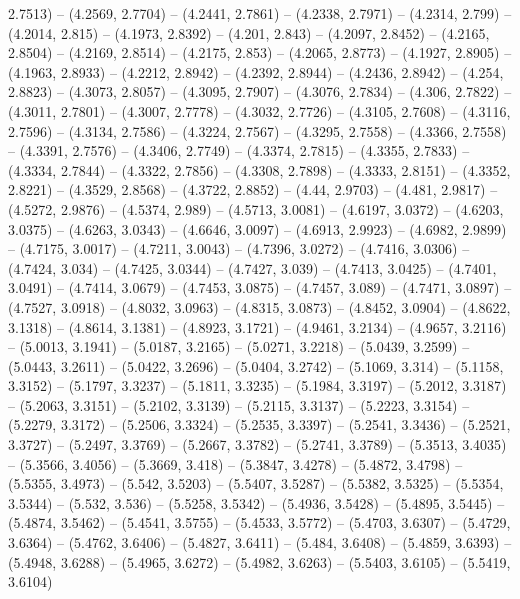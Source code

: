 {  2.7513) -- (4.2569, 2.7704) -- (4.2441, 2.7861) -- (4.2338, 2.7971) -- 
  (4.2314, 2.799) -- (4.2014, 2.815) -- (4.1973, 2.8392) -- (4.201, 2.843) -- 
  (4.2097, 2.8452) -- (4.2165, 2.8504) -- (4.2169, 2.8514) -- (4.2175, 2.853) --
   (4.2065, 2.8773) -- (4.1927, 2.8905) -- (4.1963, 2.8933) -- (4.2212, 2.8942) 
  -- (4.2392, 2.8944) -- (4.2436, 2.8942) -- (4.254, 2.8823) -- (4.3073, 2.8057)
   -- (4.3095, 2.7907) -- (4.3076, 2.7834) -- (4.306, 2.7822) -- (4.3011, 
  2.7801) -- (4.3007, 2.7778) -- (4.3032, 2.7726) -- (4.3105, 2.7608) -- 
  (4.3116, 2.7596) -- (4.3134, 2.7586) -- (4.3224, 2.7567) -- (4.3295, 2.7558) 
  -- (4.3366, 2.7558) -- (4.3391, 2.7576) -- (4.3406, 2.7749) -- (4.3374, 
  2.7815) -- (4.3355, 2.7833) -- (4.3334, 2.7844) -- (4.3322, 2.7856) -- 
  (4.3308, 2.7898) -- (4.3333, 2.8151) -- (4.3352, 2.8221) -- (4.3529, 2.8568) 
  -- (4.3722, 2.8852) -- (4.44, 2.9703) -- (4.481, 2.9817) -- (4.5272, 2.9876) 
  -- (4.5374, 2.989) -- (4.5713, 3.0081) -- (4.6197, 3.0372) -- (4.6203, 3.0375)
   -- (4.6263, 3.0343) -- (4.6646, 3.0097) -- (4.6913, 2.9923) -- (4.6982, 
  2.9899) -- (4.7175, 3.0017) -- (4.7211, 3.0043) -- (4.7396, 3.0272) -- 
  (4.7416, 3.0306) -- (4.7424, 3.034) -- (4.7425, 3.0344) -- (4.7427, 3.039) -- 
  (4.7413, 3.0425) -- (4.7401, 3.0491) -- (4.7414, 3.0679) -- (4.7453, 3.0875) 
  -- (4.7457, 3.089) -- (4.7471, 3.0897) -- (4.7527, 3.0918) -- (4.8032, 3.0963)
   -- (4.8315, 3.0873) -- (4.8452, 3.0904) -- (4.8622, 3.1318) -- (4.8614, 
  3.1381) -- (4.8923, 3.1721) -- (4.9461, 3.2134) -- (4.9657, 3.2116) -- 
  (5.0013, 3.1941) -- (5.0187, 3.2165) -- (5.0271, 3.2218) -- (5.0439, 3.2599) 
  -- (5.0443, 3.2611) -- (5.0422, 3.2696) -- (5.0404, 3.2742) -- (5.1069, 3.314)
   -- (5.1158, 3.3152) -- (5.1797, 3.3237) -- (5.1811, 3.3235) -- (5.1984, 
  3.3197) -- (5.2012, 3.3187) -- (5.2063, 3.3151) -- (5.2102, 3.3139) -- 
  (5.2115, 3.3137) -- (5.2223, 3.3154) -- (5.2279, 3.3172) -- (5.2506, 3.3324) 
  -- (5.2535, 3.3397) -- (5.2541, 3.3436) -- (5.2521, 3.3727) -- (5.2497, 
  3.3769) -- (5.2667, 3.3782) -- (5.2741, 3.3789) -- (5.3513, 3.4035) -- 
  (5.3566, 3.4056) -- (5.3669, 3.418) -- (5.3847, 3.4278) -- (5.4872, 3.4798) --
   (5.5355, 3.4973) -- (5.542, 3.5203) -- (5.5407, 3.5287) -- (5.5382, 3.5325) 
  -- (5.5354, 3.5344) -- (5.532, 3.536) -- (5.5258, 3.5342) -- (5.4936, 3.5428) 
  -- (5.4895, 3.5445) -- (5.4874, 3.5462) -- (5.4541, 3.5755) -- (5.4533, 
  3.5772) -- (5.4703, 3.6307) -- (5.4729, 3.6364) -- (5.4762, 3.6406) -- 
  (5.4827, 3.6411) -- (5.484, 3.6408) -- (5.4859, 3.6393) -- (5.4948, 3.6288) --
   (5.4965, 3.6272) -- (5.4982, 3.6263) -- (5.5403, 3.6105) -- (5.5419, 3.6104) 
}
